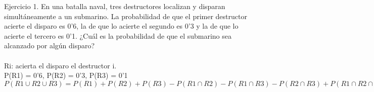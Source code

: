 \problem
Ejercicio 1. En una batalla naval, tres destructores localizan y disparan simultáneamente a un submarino. La probabilidad de que el primer destructor acierte el disparo es 0'6, la de que lo acierte el segundo es 0'3 y la de que lo acierte el tercero es 0'1. ¿Cuál es la probabilidad de que el submarino sea alcanzado por algún disparo? \\ \\
Ri: acierta el disparo el destructor i.\\
P(R1) = 0'6, P(R2) = 0'3, P(R3) = 0'1 \\
$P(R1 \cup R2 \cup R3) = P(R1) + P(R2) + P(R3) - P(R1 \cap R2) - P(R1 \cap R3) - P(R2 \cap R3) + P(R1 \cap R2 \cap R3) = 0'6+0'3+0'1-(0'6*0'1)-(0'6*0'3)-(0'1*0'3)+(0'6*0'3*0'1) = 0'748 $